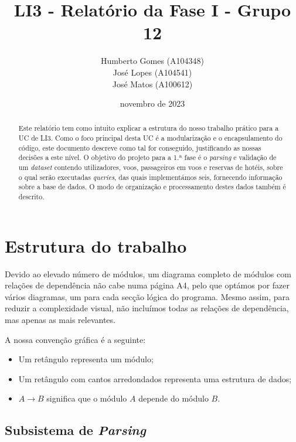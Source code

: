 \documentclass[12pt, a4paper]{article}
\title{\textbf{LI3 - Relatório da Fase I - Grupo 12}}
\author{
    Humberto Gomes (A104348) \\
    José Lopes     (A104541) \\
    José Matos     (A100612) \\
}
\date{novembro de 2023}
\begin{document}
\maketitle
\onehalfspacing
\setlength{\parskip}{\baselineskip}
\setlength{\parindent}{0pt}

\begin{abstract}
    Este relatório tem como intuito explicar a estrutura do nosso trabalho prático para a UC de LI3.
    Como o foco principal desta UC é a modularização e o encapsulamento do código, este documento
    descreve como tal for conseguido, justificando as nossas decisões a este nível. O objetivo do
    projeto para a 1.ª fase é o \emph{parsing} e validação de um \emph{dataset} contendo
    utilizadores, voos, passageiros em voos e reservas de hotéis, sobre o qual serão executadas
    \emph{queries}, das quais implementámos seis, fornecendo informação sobre a base de dados. O
    modo de organização e processamento destes dados também é descrito.
\end{abstract}

\section{Estrutura do trabalho}

Devido ao elevado número de módulos, um diagrama completo de módulos com relações de dependência
não cabe numa página A4, pelo que optámos por fazer vários diagramas, um para cada secção lógica
do programa. Mesmo assim, para reduzir a complexidade visual, não incluímos todas as relações de
dependência, mas apenas as mais relevantes.

A nossa convenção gráfica é a seguinte:

\begin{itemize}
    \item Um retângulo representa um módulo;
    \item Um retângulo com cantos arredondados representa uma estrutura de dados;
    \item $A \rightarrow B$ significa que o módulo $A$ depende do módulo $B$.
\end{itemize}

\subsection{Subsistema de \emph{Parsing}}
\label{sec:parsing}
\end{document}
